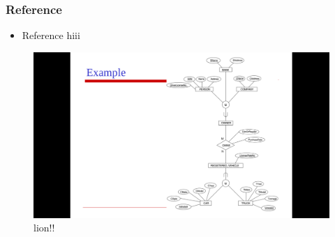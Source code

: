 \begin{frame}

\frametitle{Reference}


\begin{itemize}
\item Reference hiii



\end{itemize}
\begin{figure}
\includegraphics[scale=0.2]{lion}
\caption{lion!!}
\end{figure}

\end{frame}